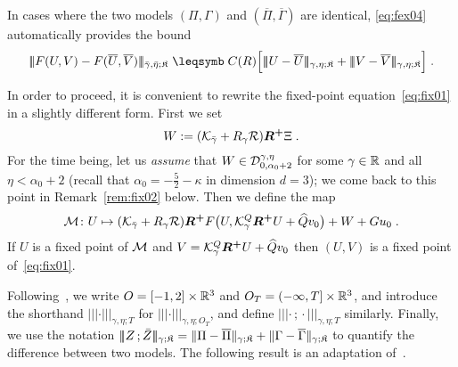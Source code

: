 \documentclass[reqno,11pt]{article}
\def\Rplus{\boldsymbol{R^+}}
\def\normDgamma#1{|\!|\!|#1|\!|\!|}
\def\seminormff#1#2{|\!|\!|#1\,\mathord{;}\,#2|\!|\!|}
\def\fraK{\mathfrak{K}}
\def\Gammabar{\overline\Gamma}
\def\Pibar{\overline\Pi}
\begin{document}
\begin{remark}
\label{rem:fix01} 
In cases where the two models $(\Pi,\Gamma)$ and $(\Pibar,\Gammabar)$ are
identical, \eqref{eq:fex04} automatically provides the bound
\begin{equation}
 \label{eq:fex_remark} 
\normDgamma{F(U,V)-F(\overline U,\overline V)}_{\bar\gamma,\bar\eta;\fraK}
\leqs C(R) \Bigbrak{\normDgamma{U-\overline U}_{\gamma,\eta;\fraK} +
\normDgamma{V-\overline V}_{\gamma,\eta;\fraK}}\;.
\end{equation} 
\end{remark}

In order to proceed, it is convenient to rewrite the fixed-point
equation~\eqref{eq:fix01} in a slightly different form. First we set 
\begin{equation}
 \label{eq:fix05}
W := (\cK_{\bar\gamma} + R_\gamma\cR)\Rplus \Xi\;.
\end{equation} 
For the time being, let us \emph{assume} that 
$W\in{\mathcal D}^{\gamma,\eta}_{0,\alpha_0+2}$ for some $\gamma\in\mathbb{R}$ and all
$\eta < \alpha_0+2$ (recall that $\alpha_0 = -\frac52 - \kappa$ in dimension
$d=3$); we come back to this point in Remark~\ref{rem:fix02} below. Then
we define the map
\begin{equation}
 \label{eq:fix06}
 \cM \colon U \mapsto 
 (\cK_{\bar\gamma}+R_\gamma\cR)\Rplus F\bigpar{U,\cK^Q_\gamma\Rplus U+\widehat
Qv_0} + W + Gu_0\;. \\
\end{equation}
If $U$ is a fixed point of ${\mathcal M}$ and $V=\cK^Q_\gamma\Rplus U+\widehat Qv_0$ then
$(U,V)$ is a fixed point of~\eqref{eq:fix01}. 

Following~\cite[Section~7.1]{Hairer2014}, we write $O=[-1,2]\times\mathbb{R}^3$ and
$O_T=(-\infty,T]\times\mathbb{R}^3$, and introduce the shorthand
$\normDgamma{\cdot}_{\gamma,\eta;T}$ for $\normDgamma{\cdot}_{\gamma,\eta;O_T}$,
and define $\seminormff{\cdot}{\cdot}_{\gamma,\eta; T}$ similarly. 
Finally, we use the notation $\seminormff{Z}{\bar Z}_{\gamma;\fraK} = 
\norm{\Pi-\Pibar}_{\gamma;\fraK} + \norm{\Gamma-\Gammabar}_{\gamma;\fraK}$ to
quantify the difference between two models.
The following result is an adaptation of~\cite[Thm.~7.8]{Hairer2014}. 
\end{document}
